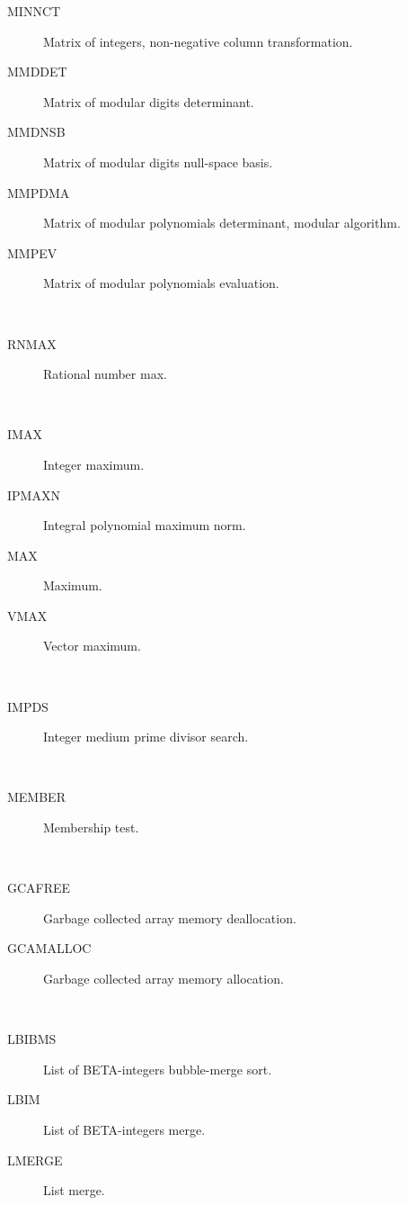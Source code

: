 \begin{description}
\begin{description}
  \item[MINNCT]  Matrix of integers, non-negative column transformation.
  \item[MMDDET]  Matrix of modular digits determinant.
  \item[MMDNSB]  Matrix of modular digits null-space basis.
  \item[MMPDMA]  Matrix of modular polynomials determinant, modular algorithm.
  \item[MMPEV]  Matrix of modular polynomials evaluation.
  \end{description}
\item[max] \ \ 
  \begin{description}
  \item[RNMAX]  Rational number max.
  \end{description}
\item[maximum] \ \ 
  \begin{description}
  \item[IMAX]  Integer maximum.
  \item[IPMAXN]  Integral polynomial maximum norm.
  \item[MAX]  Maximum.
  \item[VMAX]  Vector maximum.
  \end{description}
\item[medium] \ \ 
  \begin{description}
  \item[IMPDS]  Integer medium prime divisor search.
  \end{description}
\item[membership] \ \ 
  \begin{description}
  \item[MEMBER]  Membership test.
  \end{description}
\item[memory] \ \ 
  \begin{description}
  \item[GCAFREE]  Garbage collected array memory deallocation.
  \item[GCAMALLOC]  Garbage collected array memory allocation.
  \end{description}
\item[merge] \ \ 
  \begin{description}
  \item[LBIBMS]  List of BETA-integers bubble-merge sort.
  \item[LBIM]  List of BETA-integers merge.
  \item[LMERGE]  List merge.

\end{description}
\end{description}

